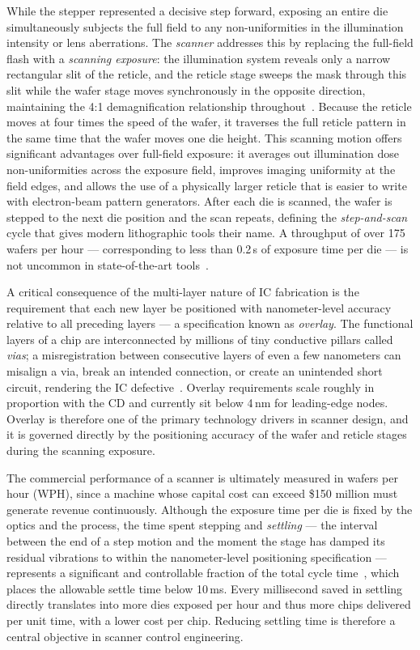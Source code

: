 While the stepper represented a decisive step forward, exposing an entire die simultaneously subjects the full field to any non-uniformities in the illumination intensity or lens aberrations. The \textit{scanner} addresses this by replacing the full-field flash with a \textit{scanning exposure}: the illumination system reveals only a narrow rectangular slit of the reticle, and the reticle stage sweeps the mask through this slit while the wafer stage moves synchronously in the opposite direction, maintaining the 4:1 demagnification relationship throughout~\cite{Butler2011_PositionControl, Schmidt2012_UltraPrecision}. Because the reticle moves at four times the speed of the wafer, it traverses the full reticle pattern in the same time that the wafer moves one die height. This scanning motion offers significant advantages over full-field exposure: it averages out illumination dose non-uniformities across the exposure field, improves imaging uniformity at the field edges, and allows the use of a physically larger reticle that is easier to write with electron-beam pattern generators. After each die is scanned, the wafer is stepped to the next die position and the scan repeats, defining the \textit{step-and-scan} cycle that gives modern lithographic tools their name. A throughput of over 175 wafers per hour — corresponding to less than 0.2\,s of exposure time per die — is not uncommon in state-of-the-art tools~\cite{Butler2011_PositionControl}.

A critical consequence of the multi-layer nature of IC fabrication is the requirement that each new layer be positioned with nanometer-level accuracy relative to all preceding layers — a specification known as \textit{overlay}. The functional layers of a chip are interconnected by millions of tiny conductive pillars called \textit{vias}; a misregistration between consecutive layers of even a few nanometers can misalign a via, break an intended connection, or create an unintended short circuit, rendering the IC defective~\cite{Schmidt2012_UltraPrecision}. Overlay requirements scale roughly in proportion with the CD and currently sit below 4\,nm for leading-edge nodes. Overlay is therefore one of the primary technology drivers in scanner design, and it is governed directly by the positioning accuracy of the wafer and reticle stages during the scanning exposure.

The commercial performance of a scanner is ultimately measured in wafers per hour (WPH), since a machine whose capital cost can exceed \$150 million must generate revenue continuously. Although the exposure time per die is fixed by the optics and the process, the time spent stepping and \textit{settling} — the interval between the end of a step motion and the moment the stage has damped its residual vibrations to within the nanometer-level positioning specification — represents a significant and controllable fraction of the total cycle time~\cite{Butler2011_PositionControl}, which places the allowable settle time below 10\,ms. Every millisecond saved in settling directly translates into more dies exposed per hour and thus more chips delivered per unit time, with a lower cost per chip. Reducing settling time is therefore a central objective in scanner control engineering.

